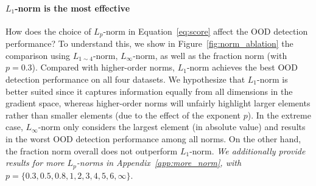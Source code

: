 \documentclass{article}
\begin{document}






\vspace{-0.2cm}
\paragraph{$L_1$-norm is the most effective} How does the choice of $L_p$-norm in Equation~\ref{eq:score} affect the OOD detection performance? To understand this, we show in Figure~\ref{fig:norm_ablation} the comparison using $L_{1 \sim 4}$-norm, $L_{\infty}$-norm, as well as the fraction norm (with $p=0.3$). 
Compared with higher-order norms, $L_1$-norm achieves the best OOD detection performance on all four datasets. We hypothesize that $L_1$-norm is better suited since it captures information equally from all dimensions in the gradient space, whereas higher-order norms will unfairly highlight larger elements rather than smaller elements (due to the effect of the exponent $p$). In the extreme case, $L_{\infty}$-norm only considers the largest element (in absolute value) and results in the worst OOD detection performance among all norms. 
On the other hand, the fraction norm overall does not outperform $L_1$-norm. \emph{We additionally provide results for more $L_p$-norms in Appendix~\ref{app:more_norm}, with $p=\{0.3, 0.5, 0.8, 1,2,3,4,5,6,\infty\}$}. 
\end{document}
